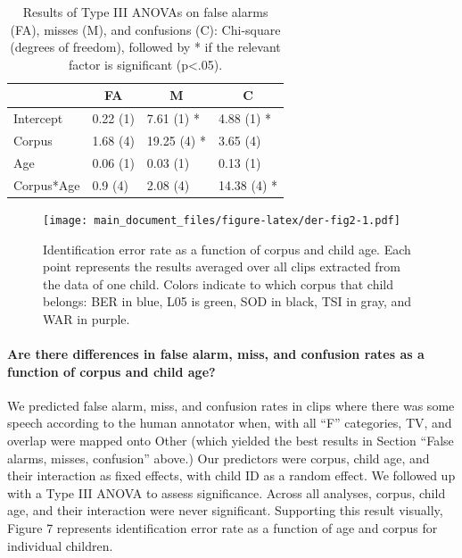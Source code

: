 \documentclass[english,table,man,floatsintext]{apa6}
\let\oldparagraph\paragraph
\renewcommand{\paragraph}[1]{\oldparagraph{#1}\mbox{}}
\begin{document}
\begin{table}[tbp]

\begin{center}
\begin{threeparttable}

\caption{\label{tab:anovatab}Results of Type III ANOVAs on false alarms (FA), misses (M), and confusions (C): Chi-square (degrees of freedom), followed by * if the relevant factor is significant (p<.05).}

\begin{tabular}{llll}
\toprule
 & \multicolumn{1}{c}{FA} & \multicolumn{1}{c}{M} & \multicolumn{1}{c}{C}\\
\midrule
Intercept & 0.22 (1) & 7.61 (1) * & 4.88 (1) *\\
Corpus & 1.68 (4) & 19.25 (4) * & 3.65 (4)\\
Age & 0.06 (1) & 0.03 (1) & 0.13 (1)\\
Corpus*Age & 0.9 (4) & 2.08 (4) & 14.38 (4) *\\
\bottomrule
\end{tabular}

\end{threeparttable}
\end{center}

\end{table}

\begin{figure}
\centering
\texttt{[image: main\_document\_files/figure-latex/der-fig2-1.pdf]}
\caption{\label{fig:der-fig2}Identification error rate as a function of corpus and child age. Each point represents the results averaged over all clips extracted from the data of one child. Colors indicate to which corpus that child belongs: BER in blue, L05 is green, SOD in black, TSI in gray, and WAR in purple.}
\end{figure}

\hypertarget{are-there-differences-in-false-alarm-miss-and-confusion-rates-as-a-function-of-corpus-and-child-age}{%
\paragraph{Are there differences in false alarm, miss, and confusion rates as a function of corpus and child age?}\label{are-there-differences-in-false-alarm-miss-and-confusion-rates-as-a-function-of-corpus-and-child-age}}

We predicted false alarm, miss, and confusion rates in clips where there was some speech according to the human annotator when, with all \enquote{F} categories, TV, and overlap were mapped onto Other (which yielded the best results in Section \enquote{False alarms, misses, confusion} above.) Our predictors were corpus, child age, and their interaction as fixed effects, with child ID as a random effect. We followed up with a Type III ANOVA to assess significance. Across all analyses, corpus, child age, and their interaction were never significant. Supporting this result visually, Figure 7 represents identification error rate as a function of age and corpus for individual children.
\end{document}
